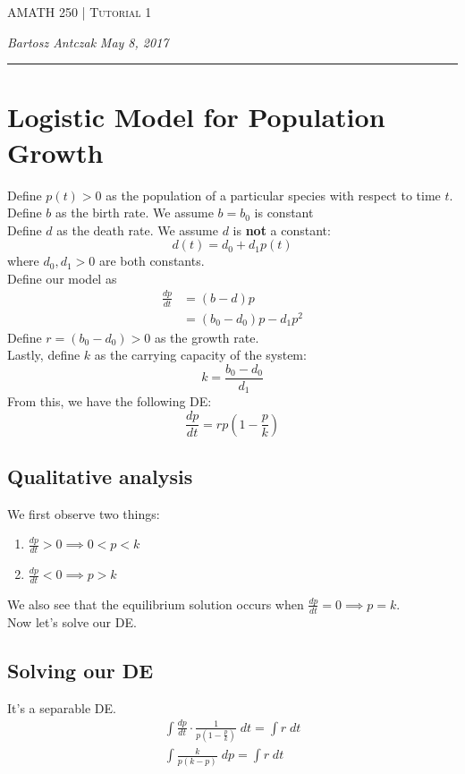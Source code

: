 \documentclass{report}
\newcommand{\lectureNum}{1}
\newcommand{\curDate}{May 8, 2017}
\newcommand{\course}{AMATH 250}
\begin{document}
\begin{center}
\begin{Large}
\textsc{\course{} | Tutorial \lectureNum{}}
\end{Large}
\end{center} 
\noindent \textit{Bartosz Antczak} \hfill
\textit{\curDate{}}
\rule{\textwidth}{0.4pt}
\section{Logistic Model for Population Growth}
Define $p(t) > 0$ as the population of a particular species with respect to time $t$.\\
Define $b$ as the birth rate. We assume $b = b_0$ is constant \\
Define $d$ as the death rate. We assume $d$ is \textbf{not} a constant:
$$d(t) = d_0 + d_1p(t)$$
where $d_0, d_1 > 0$ are both constants. \\
Define our model as 
\begin{align}
\frac{dp}{dt} &= (b - d)p\\&= (b_0 - d_0)p - d_1p^2
\end{align}
Define $r = (b_0 - d_0) > 0$ as the growth rate.\\
Lastly, define $k$ as the carrying capacity of the system:
$$k = \frac{b_0 - d_0}{d_1}$$
From this, we have the following DE:
$$\frac{dp}{dt} = rp\left(1 - \frac{p}{k}\right)$$
\subsection{Qualitative analysis}
We first observe two things:
\begin{enumerate}
    \item $\frac{dp}{dt} > 0 \implies 0 < p < k$
    \item $\frac{dp}{dt} < 0 \implies p > k$
\end{enumerate}
We also see that the equilibrium solution occurs when $\frac{dp}{dt} = 0 \implies p = k.$\\Now let's solve our DE.
\subsection{Solving our DE}
It's a separable DE.
\begin{align}
    \int \frac{dp}{dt} \cdot \frac{1}{p\left(1 - \frac{p}{k}\right)} \; dt = \int r \; dt \\
    \int \frac{k}{p(k-p)} \; dp = \int r \; dt
\end{align}
\end{document}
